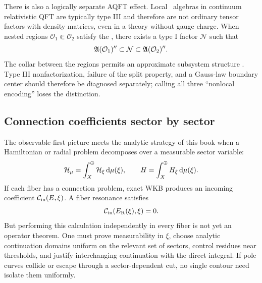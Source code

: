 There is also a logically separate AQFT effect.  Local \vN\ algebras
in continuum relativistic QFT are typically type III and therefore are not
ordinary tensor factors with density matrices, even in a theory without gauge
charge.  When nested regions $\mathcal O_1\Subset\mathcal O_2$ satisfy the
, there exists a type I factor $\mathcal N$ such that
\begin{equation}
  \mathfrak{A}(\mathcal O_1)''
  \subset\mathcal N
  \subset\mathfrak{A}(\mathcal O_2)''.
  \label{eq:split-inclusion}
\end{equation}
The collar between the regions permits an approximate subsystem structure
\cite{FewsterSplit:2015}.  Type III nonfactorization, failure of the split
property, and a Gauss-law boundary center should therefore be diagnosed
separately; calling all three ``nonlocal encoding'' loses the distinction.

\subsection{Connection coefficients sector by sector}

The observable-first picture meets the analytic strategy of this book when a
Hamiltonian or radial problem decomposes over a measurable sector variable:
\begin{equation}
  \mathcal{H}_\mu=\int_X^\oplus\mathcal{H}_\xi\,\mathrm{d}\mu(\xi),
  \qquad
  H=\int_X^\oplus H_\xi\,\mathrm{d}\mu(\xi).
  \label{eq:sectorwise-hamiltonian}
\end{equation}
If each fiber has a connection problem, exact WKB produces an incoming
coefficient $\mathcal{C}_{\mathrm{in}}(E,\xi)$.  A fiber resonance satisfies
\begin{equation}
  \mathcal{C}_{\mathrm{in}}(E_{\mathrm{R}}(\xi),\xi)=0.
  \label{eq:sectorwise-resonance-condition}
\end{equation}
But performing this calculation independently in every fiber is not yet an
operator theorem.  One must prove measurability in $\xi$, choose analytic
continuation domains uniform on the relevant set of sectors, control residues
near thresholds, and justify interchanging continuation with the direct
integral.  If pole curves collide or escape through a sector-dependent cut,
no single contour need isolate them uniformly.

